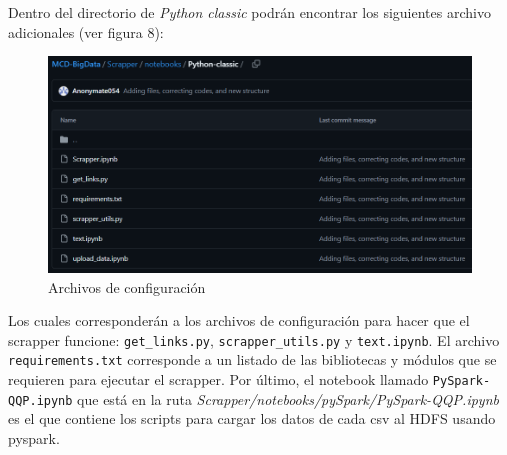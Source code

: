 \documentclass{article}
\begin{document}
\newpage
Dentro del directorio de \textit{Python classic} podrán encontrar los siguientes archivo adicionales (ver figura 8):

\begin{figure}[h]
\centering
\includegraphics[width=0.3\linewidth]{Reports/images/files.png}
\caption{\label{fig:files}Archivos de configuración}
\end{figure}


Los cuales corresponderán a los archivos de configuración para hacer que el scrapper funcione: \verb|get_links.py|, \verb|scrapper_utils.py| y \verb|text.ipynb|. El archivo \verb|requirements.txt| corresponde a un listado de las bibliotecas y módulos que se requieren para ejecutar el scrapper. 
Por último, el notebook llamado \verb|PySpark-QQP.ipynb| que está en la ruta \textit{Scrapper/notebooks/pySpark/PySpark-QQP.ipynb} es el que contiene los scripts para cargar los datos de cada csv al HDFS usando pyspark. 
\end{document}
